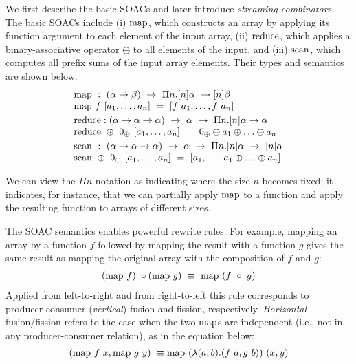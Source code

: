 We first describe the basic SOACs and later introduce
\textit{streaming combinators}. The basic SOACs include (i) $\mathrm{map}$,
which constructs an array by applying its function argument to each
element of the input array, (ii) $\mathrm{reduce}$, which applies a
binary-associative operator $\oplus$ to all elements of the input, and
(iii) $\mathrm{scan}$, which computes all prefix sums of the input array
elements.  Their types and semantics are shown below:
%
\[ \begin{array}{l}
\cmap ~ : ~ (\alpha \to \beta) ~ \to ~ \Pi n. [n]\alpha ~ \to [n]\beta \\
\cmap ~ f ~ [a_1, \ldots, a_n] ~ = ~ [f ~ a_1, \ldots, f ~ a_n]\smallskip\\
\creduce : (\alpha \to \alpha \to \alpha) ~ \to ~ \alpha ~ \to ~ \Pi n.[n]\alpha \to \alpha\\
\creduce ~ \oplus ~ 0_{\oplus} ~ [a_1, \ldots, a_n] ~ = ~ 0_{\oplus} \oplus a_1 \oplus \ldots \oplus a_n\smallskip\\
\cscan ~ : ~ (\alpha \to \alpha \to \alpha) ~ \to ~ \alpha ~ \to ~ \Pi n.[n]\alpha ~ \to ~ [n]\alpha\\
\cscan ~ \oplus ~ 0_{\oplus} ~ [a_1, \ldots, a_n] ~ = ~ [a_1, \ldots, a_1 \oplus \ldots \oplus a_n]\\
\end{array} \]

\noindent We can view the $\Pi n$ notation as indicating where the
size $n$ becomes fixed; it indicates, for instance, that we can
partially apply $\mathrm{map}$ to a function and apply the resulting function
to arrays of different sizes.

%

The SOAC semantics enables powerful rewrite rules.  For example,
mapping an array by a function $f$ followed by mapping the result
with a function $g$ gives the same result as mapping the original
array with the composition of $f$ and $g$:
\[ \begin{array}{l}
(\mathrm{map} ~ f) ~ \circ (\mathrm{map} ~ g) ~ \equiv ~ \mathrm{map} ~ (f ~ \circ ~ g)
\end{array} \]
Applied from left-to-right and from right-to-left this
rule corresponds to producer-consumer (\textit{vertical}) fusion and fission,
respectively.
%
\textit{Horizontal} fusion/fission refers to the case when the two
$\mathrm{map}{}$s are independent (i.e., not in any producer-consumer
relation), as in the equation below:
\[ \begin{array}{l}
(\mathrm{map} ~ f ~ x, \mathrm{map} ~ g ~ y) ~ \equiv\mathrm{map} ~ (\lambda(a,b).(f~a,g~b)) ~ (x,y)
\end{array} \]


